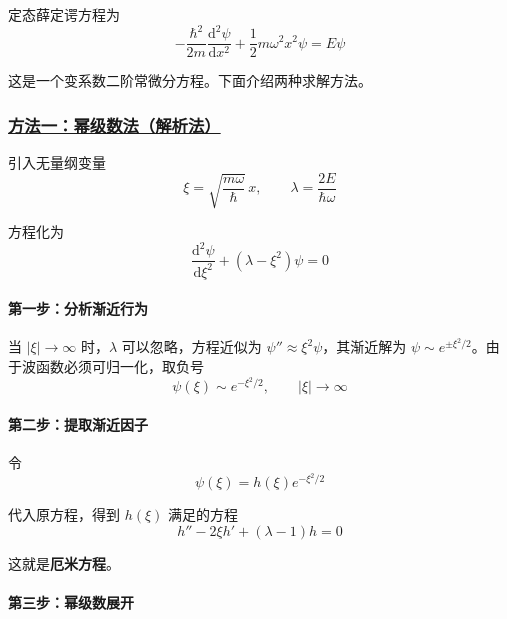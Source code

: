定态薛定谔方程为
\begin{equation}
    -\frac{\hbar^2}{2m}\frac{\mathrm{d}^2\psi}{\mathrm{d}x^2} + \frac{1}{2}m\omega^2 x^2\psi = E\psi
\end{equation}

这是一个变系数二阶常微分方程。下面介绍两种求解方法。

\subsubsection{\protect\hyperlink{:}{方法一：幂级数法（解析法）}}

引入无量纲变量
\begin{equation}
    \xi = \sqrt{\frac{m\omega}{\hbar}}\,x, \qquad \lambda = \frac{2E}{\hbar\omega}
\end{equation}

方程化为
\begin{equation}
    \frac{\mathrm{d}^2\psi}{\mathrm{d}\xi^2} + (\lambda - \xi^2)\psi = 0
\end{equation}

\paragraph*{第一步：分析渐近行为}

当 $|\xi| \to \infty$ 时，$\lambda$ 可以忽略，方程近似为 $\psi'' \approx \xi^2\psi$，其渐近解为 $\psi \sim e^{\pm\xi^2/2}$。由于波函数必须可归一化，取负号
\begin{equation}
    \psi(\xi) \sim e^{-\xi^2/2}, \qquad |\xi| \to \infty
\end{equation}

\paragraph*{第二步：提取渐近因子}

令
\begin{equation}
    \psi(\xi) = h(\xi)e^{-\xi^2/2}
\end{equation}

代入原方程，得到 $h(\xi)$ 满足的方程
\begin{equation}
    h'' - 2\xi h' + (\lambda - 1)h = 0
\end{equation}

这就是\textbf{厄米方程}。

\paragraph*{第三步：幂级数展开}

